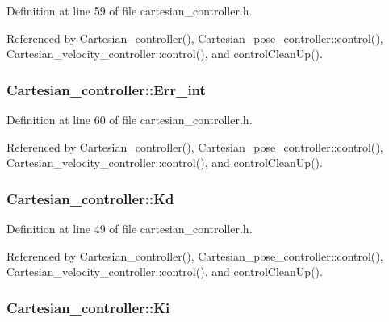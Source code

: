 Definition at line 59 of file cartesian\-\_\-controller.\-h.



Referenced by Cartesian\-\_\-controller(), Cartesian\-\_\-pose\-\_\-controller\-::control(), Cartesian\-\_\-velocity\-\_\-controller\-::control(), and control\-Clean\-Up().

\hypertarget{classCartesian__controller_a248174c6399a8933bfcc8f1b0b39af5e}{
\subsubsection[{Err\-\_\-int}]{ Cartesian\-\_\-controller\-::\-Err\-\_\-int\hspace{0.3cm}{\ttfamily [protected]}}}\label{classCartesian__controller_a248174c6399a8933bfcc8f1b0b39af5e}


Definition at line 60 of file cartesian\-\_\-controller.\-h.



Referenced by Cartesian\-\_\-controller(), Cartesian\-\_\-pose\-\_\-controller\-::control(), Cartesian\-\_\-velocity\-\_\-controller\-::control(), and control\-Clean\-Up().

\hypertarget{classCartesian__controller_a62394cef8a9a29eac18319a4ad579c4c}{
\subsubsection[{Kd}]{ Cartesian\-\_\-controller\-::\-Kd\hspace{0.3cm}{\ttfamily [protected]}}}\label{classCartesian__controller_a62394cef8a9a29eac18319a4ad579c4c}


Definition at line 49 of file cartesian\-\_\-controller.\-h.



Referenced by Cartesian\-\_\-controller(), Cartesian\-\_\-pose\-\_\-controller\-::control(), Cartesian\-\_\-velocity\-\_\-controller\-::control(), and control\-Clean\-Up().

\hypertarget{classCartesian__controller_a70e495f39da706f1b589684f58343b9e}{
\subsubsection[{Ki}]{ Cartesian\-\_\-controller\-::\-Ki\hspace{0.3cm}{\ttfamily [protected]}}}\label{classCartesian__controller_a70e495f39da706f1b589684f58343b9e}


